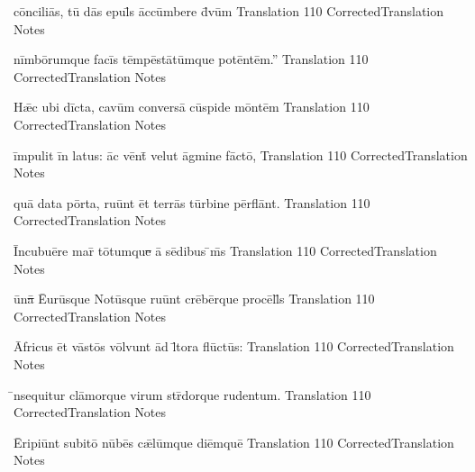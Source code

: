 \documentclass[]{book}
\begin{document}
\latline
  {c\=onc\-il\-i\={\macron a}s, t\={\macron u} d\={\macron a}s \-ep\-ul\={\macron {\i}}s \=acc\=umb\-er\-e d\={\macron {\i}}v\=um
}
  { Translation }
  {110}
  { CorrectedTranslation }
  { Notes }
\newpage

\latline
  {n\=imb\={\macron o}r\-umqu\-e f\-ac\=is t\=emp\=est\={\macron a}t\=umqu\-e p\-ot\=ent\=em.''
}
  { Translation }
  {110}
  { CorrectedTranslation }
  { Notes }


\latline
  {H\={\ae}c \-ub\-i d\=ict\-a, c\-av\=um c\-onv\-ers\={\macron a} c\=usp\-id\-e m\=ont\=em
}
  { Translation }
  {110}
  { CorrectedTranslation }
  { Notes }


\latline
  {\=imp\-ul\-it \=in l\-at\-us:  \=ac v\=ent\={\macron {\i}} v\-el\-ut \=agm\-in\-e f\=act\={\macron o},
}
  { Translation }
  {110}
  { CorrectedTranslation }
  { Notes }

\newpage
\latline
  {qu\={\macron a} d\-at\-a p\=ort\-a, r\-u\=unt \=et t\-err\={\macron a}s t\=urb\-in\-e p\=erfl\=ant.
}
  { Translation }
  {110}
  { CorrectedTranslation }
  { Notes }


\latline
  {\=Inc\-ub\-u\={\macron e}r\-e m\-ar\={\macron {\i}} t\={\macron o}tumqu\sout{e }\={\macron a} s\={\macron e}d\-ib\-us \={\macron {\i}}m\={\macron {\i}}s
}
  { Translation }
  {110}
  { CorrectedTranslation }
  { Notes }


\latline
  {\={\macron u}n\sout{\={\macron a} }\={Eu}r\=usqu\-e N\-ot\=usqu\-e r\-u\=unt cr\={\macron e}b\=erqu\-e pr\-oc\=ell\={\macron {\i}}s
}
  { Translation }
  {110}
  { CorrectedTranslation }
  { Notes }
\newpage

\latline
  {\={\macron A}fr\-ic\-us \=et v\=ast\={\macron o}s v\=olvunt \=ad l\={\macron {\i}}t\-or\-a fl\={\macron u}ct\={\macron u}s:
}
  { Translation }
  {110}
  { CorrectedTranslation }
  { Notes }


\latline
  {\={\macron {\i}}nsequitur cl\={\macron a}morque virum str\={\macron {\i}}dorque rudentum.
}
  { Translation }
  {110}
  { CorrectedTranslation }
  { Notes }

\latline
  {\={\macron E}r\-ip\-i\=unt s\-ub\-it\={\macron o} n\={\macron u}b\={\macron e}s c\={\ae}l\=umqu\-e d\-i\=emqu\=e
}
  { Translation }
  {110}
  { CorrectedTranslation }
  { Notes }


%
\end{document}
